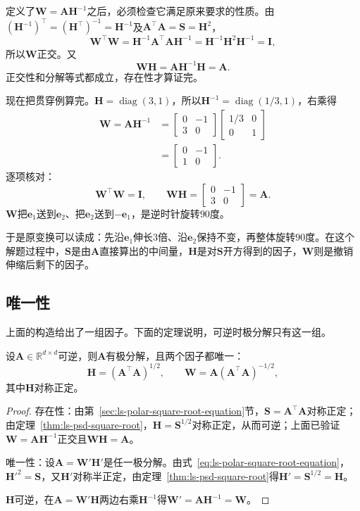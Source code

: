 定义了$\bm W=\bm A\bm H^{-1}$之后，必须检查它满足原来要求的性质。由$(\bm H^{-1})^\top=(\bm H^\top)^{-1}=\bm H^{-1}$及$\bm A^\top\bm A=\bm S=\bm H^2$，
\[
 \bm W^\top\bm W
 =\bm H^{-1}\bm A^\top\bm A\bm H^{-1}
 =\bm H^{-1}\bm H^2\bm H^{-1}
 =\bm I ,
\]
所以$\bm W$正交。又
\[
 \bm W\bm H=\bm A\bm H^{-1}\bm H=\bm A .
\]
正交性和分解等式都成立，存在性才算证完。

现在把贯穿例算完。$\bm H=\operatorname{diag}(3,1)$，所以$\bm H^{-1}=\operatorname{diag}(1/3,1)$，右乘得
\[
 \begin{aligned}
 \bm W=\bm A\bm H^{-1}
 &=\begin{bmatrix}0&-1\\3&0\end{bmatrix}
 \begin{bmatrix}1/3&0\\0&1\end{bmatrix}\\
 &=\begin{bmatrix}0&-1\\1&0\end{bmatrix}.
 \end{aligned}
\]
逐项核对：
\[
 \bm W^\top\bm W=\bm I,\qquad
 \bm W\bm H=\begin{bmatrix}0&-1\\3&0\end{bmatrix}=\bm A .
\]
$\bm W$把$\bm e_1$送到$\bm e_2$、把$\bm e_2$送到$-\bm e_1$，是逆时针旋转$90$度。

于是原变换可以读成：先沿$\bm e_1$伸长$3$倍、沿$\bm e_2$保持不变，再整体旋转$90$度。在这个解题过程中，$\bm S$是由$\bm A$直接算出的中间量，$\bm H$是对$\bm S$开方得到的因子，$\bm W$则是撤销伸缩后剩下的因子。

\subsection{唯一性}
\label{sec:ls-polar-invertible-uniqueness}

上面的构造给出了一组因子。下面的定理说明，可逆时极分解只有这一组。
\begin{theorem}[可逆矩阵的极分解]
\label{thm:ls-polar-invertible}
设$\bm A\in\mathbb R^{d\times d}$可逆，则$\bm A$有极分解，且两个因子都唯一：
\begin{equation}
 \bm H=(\bm A^\top\bm A)^{1/2},\qquad
 \bm W=\bm A(\bm A^\top\bm A)^{-1/2},
 \label{eq:ls-polar-invertible-factors}
\end{equation}
其中$\bm H$对称正定。
\end{theorem}
\begin{proof}
存在性：由第~\ref{sec:ls-polar-square-root-equation}节，$\bm S=\bm A^\top\bm A$对称正定；由定理~\ref{thm:ls-psd-square-root}，$\bm H=\bm S^{1/2}$对称正定，从而可逆；上面已验证$\bm W=\bm A\bm H^{-1}$正交且$\bm W\bm H=\bm A$。

唯一性：设$\bm A=\bm W'\bm H'$是任一极分解。由式~\eqref{eq:ls-polar-square-root-equation}，$\bm H'^2=\bm S$，又$\bm H'$对称半正定，由定理~\ref{thm:ls-psd-square-root}得$\bm H'=\bm S^{1/2}=\bm H$。

$\bm H$可逆，在$\bm A=\bm W'\bm H$两边右乘$\bm H^{-1}$得$\bm W'=\bm A\bm H^{-1}=\bm W$。
\end{proof}

